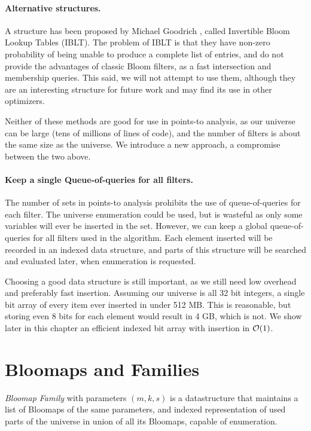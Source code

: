 \paragraph{Alternative structures.} A structure has been proposed by Michael
Goodrich \cite{goodrich:2011}, called Invertible Bloom Lookup Tables (IBLT). The
problem of IBLT is that they have non-zero probability of being unable to
produce a complete list of entries, and do not provide the advantages of classic
Bloom filters, as a fast intersection and membership queries. This said, we will
not attempt to use them, although they are an interesting structure for future
work and may find its use in other optimizers.

Neither of these methods are good for use in points-to analysis, as our universe
can be large (tens of millions of lines of code), and the number of filters is about the
same size as the universe. We introduce a new approach, a compromise between the
two above.

\paragraph{Keep a single Queue-of-queries for all filters.} The number of sets
in points-to analysis prohibits the use of queue-of-queries for each filter. The universe
enumeration could be used, but is wasteful as only some variables will ever be
inserted in the set. However, we can keep a global queue-of-queries for all
filters used in the algorithm. Each element inserted will be recorded in an
indexed data structure, and parts of this structure will be searched and
evaluated later, when enumeration is requested.

Choosing a good data structure is still important, as we still need low overhead
and preferably fast insertion. Assuming our universe is all 32 bit integers, a
single bit array of every item ever inserted in under 512 MB. This is
reasonable, but storing even 8 bits for each element would result in 4 GB, which
is not. We show later in this chapter an efficient indexed bit array with
insertion in $\mathcal{O}(1)$.


\section{Bloomaps and Families}

{\it Bloomap Family} with parameters $(m, k, s)$ is a datastructure that
maintains a list of Bloomaps of the same parameters, and indexed representation
of used parts of the universe in union of all its Bloomaps, capable of
enumeration.

